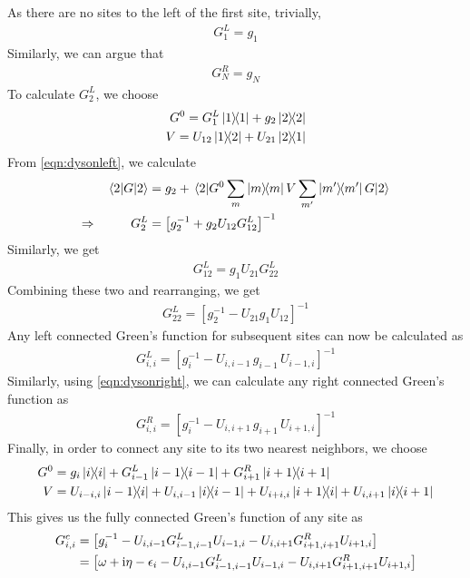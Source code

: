 	As there are no sites to the left of the first site, trivially,
	\begin{align}
		G^{L}_{1} = g_{1}
	\end{align}
	Similarly, we can argue that
	\begin{align}
	G^{R}_{N} = g_{N}
	\end{align}
	To calculate $ G^{L}_{2} $, we choose
	\begin{align}
		G^{0} = G^{L}_{1}\ketbra{1}{1} + g_2 \ketbra{2}{2}\\
		V = U_{12}\ketbra{1}{2} + U_{21}\ketbra{2}{1}
	\end{align}
	From \eqref{eqn:dysonleft}, we calculate
	\begin{align}
		\nonumber&&\mel{2}{G}{2} &= g_2 + \mel{2}{G^{0}\sum_{m}\ketbra{m}{m}V\sum_{m'}\ketbra{m'}{m'}G}{2} \\
		\Rightarrow && G^{L}_{2} &= \left[ g^{-1}_2 + g_2 U_{12} G^{L}_{12} \right]^{-1}
	\end{align}
	Similarly, we get
	\begin{align}
		G^{L}_{12} = g_1 U_{21} G^{L}_{22}
	\end{align}
	Combining these two and rearranging, we get
	\begin{align}
		G^{L}_{22} = \left[ g^{-1}_2 - U_{21} g_1 U_{12}  \right]^{-1}
	\end{align}
	Any left connected Green's function for subsequent sites can now be calculated as
	\begin{align}
		G^{L}_{i,i} = \left[ g^{-1}_i - U_{i,i-1}\,g_{i-1}\,U_{i-1,i}  \right]^{-1}
	\end{align}
	Similarly, using \eqref{eqn:dysonright}, we can calculate any right connected Green's function as
	\begin{align}
		G^{R}_{i,i} = \left[ g^{-1}_i - U_{i,i+1}\,g_{i+1}\,U_{i+1,i}  \right]^{-1}
	\end{align}
	Finally, in order to connect any site to its two nearest neighbors, we choose
	\begin{align}
		G^{0} &= g_{i}\ketbra{i}{i} + G^{L}_{i-1}\ketbra{i-1}{i-1} + G^{R}_{i+1}\ketbra{i+1}{i+1}\\
		V &= U_{i-i,i}\ketbra{i-1}{i} + U_{i,i-1}\ketbra{i}{i-1} + U_{i+i,i}\ketbra{i+1}{i} + U_{i,i+1}\ketbra{i}{i+1}
	\end{align}
	This gives us the fully connected Green's function of any site as
	\begin{align}
		\nonumber G^{c}_{i,i} &= \left[ g^{-1}_{i} - U_{i,i-1} G^{L}_{i-1, i-1} U_{i-1,i} - U_{i,i+1} G^{R}_{i+1,i+1} U_{i+1,i} \right]\\
		&= \left[ \omega + \mathrm{i} \eta -\epsilon_i - U_{i,i-1} G^{L}_{i-1, i-1} U_{i-1,i} - U_{i,i+1} G^{R}_{i+1,i+1} U_{i+1,i} \right]
	\end{align}
